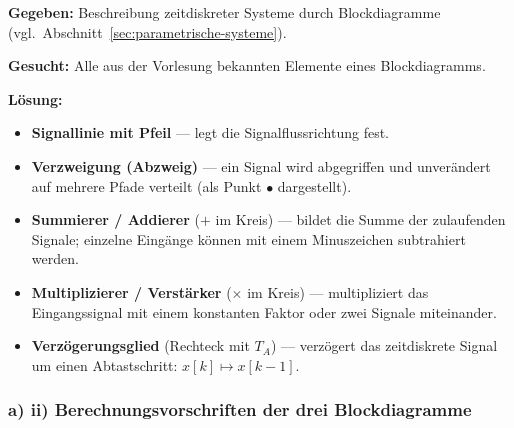 \begin{beispiel}

\textbf{Gegeben:} Beschreibung zeitdiskreter Systeme durch Blockdiagramme
(vgl.\ Abschnitt~\ref{sec:parametrische-systeme}).

\textbf{Gesucht:} Alle aus der Vorlesung bekannten Elemente eines Blockdiagramms.

\textbf{Lösung:}

\begin{itemize}
  \item \textbf{Signallinie mit Pfeil} — legt die Signalflussrichtung fest.
  \item \textbf{Verzweigung (Abzweig)} — ein Signal wird abgegriffen und
        unverändert auf mehrere Pfade verteilt (als Punkt $\bullet$ dargestellt).
  \item \textbf{Summierer / Addierer} ($+$ im Kreis) — bildet die Summe der
        zulaufenden Signale; einzelne Eingänge können mit einem
        Minuszeichen subtrahiert werden.
  \item \textbf{Multiplizierer / Verstärker} ($\times$ im Kreis) — multipliziert
        das Eingangssignal mit einem konstanten Faktor oder zwei Signale
        miteinander.
  \item \textbf{Verzögerungsglied} (Rechteck mit $T_A$) — verzögert das
        zeitdiskrete Signal um einen Abtastschritt: $x[k] \mapsto x[k-1]$.
\end{itemize}

\end{beispiel}

\subsubsection*{a) ii) Berechnungsvorschriften der drei Blockdiagramme}

